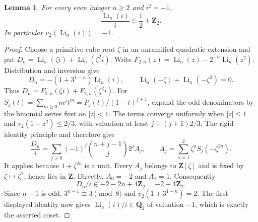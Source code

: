 \documentclass[11pt,a4paper]{amsart}
\numberwithin{equation}{section}
\newtheorem{lemma}[theorem]{Lemma}
\theoremstyle{definition}
\theoremstyle{remark}
\newcommand{\Q}{\mathbf Q}
\newcommand{\Z}{\mathbf Z}
\begin{document}
\begin{lemma}
\label{d3:lem:evenweightibase}
For every even integer $n\geq2$ and $i^2=-1$,
\[
 \frac{\operatorname{Li}_n(i)}{i}\in\frac12+\Z_2.
\]
In particular $v_2(\operatorname{Li}_n(i))=-1$.
\end{lemma}
\begin{proof}
Choose a primitive cube root $\zeta$ in an unramified quadratic
extension and put
$D_n=\operatorname{Li}_n(\zeta i)+\operatorname{Li}_n(\zeta^2i)$.
Write $F_{2,n}(z)=\operatorname{Li}_n(z)-2^{-n}\operatorname{Li}_n(z^2)$.
Distribution and inversion give
\[
 D_n=-(1+3^{1-n})\operatorname{Li}_n(i),\qquad
 \operatorname{Li}_n(-\zeta)+\operatorname{Li}_n(-\zeta^2)=0.
\]
Thus $D_n=F_{2,n}(\zeta i)+F_{2,n}(\zeta^2i)$.
For $S_j(t)=\sum_{m\geq0}m^jt^m
=P_j(t)/(1-t)^{j+1}$, expand the odd denominators by the binomial
series first on $|z|<1$. The terms converge uniformly when
$|z|\leq1$ and $v_2(1-z^2)\leq2/3$, with valuation at least
$j-(j+1)2/3$. The rigid identity principle and
\cite[Theorem~2.7(3)]{BesserDeJeuAlgorithm} therefore give
\[
 \frac{D_n}{i}
 =\sum_{j\geq0}(-1)^j\binom{n+j-1}{j}2^j A_j,
 \qquad A_j=\sum_{a=1}^2\zeta^a S_j(-\zeta^{2a}).
\]
It applies because $1+\zeta^{2a}$ is a unit.
Every $A_j$ belongs to $\Z[\zeta]$ and is fixed by
$\zeta\mapsto\zeta^2$, hence lies in $\Z$.
Directly, $A_0=-2$ and $A_1=1$.
Consequently
\[
 D_n/i\in-2-2n+4\Z_2=-2+4\Z_2.
\]
Since $n-1$ is odd, $3^{n-1}\equiv3\pmod8$ and
$v_2(1+3^{1-n})=2$.
The first displayed identity now gives
$\operatorname{Li}_n(i)/i\in\Q_2$ of valuation $-1$,
which is exactly the asserted coset.
\end{proof}
\end{document}

